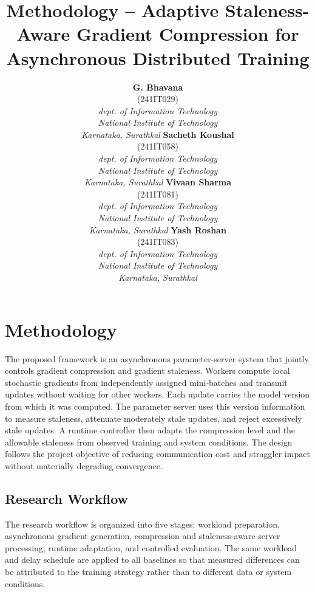 \documentclass[conference]{IEEEtran}
\title{Methodology -- Adaptive Staleness-Aware Gradient Compression for Asynchronous Distributed Training}
\author{%
\begin{tabular*}{\textwidth}{@{\extracolsep{\fill}}cccc@{}}
\parbox[t]{0.22\textwidth}{\centering
\textbf{G. Bhavana}\\[-1pt]
(241IT029)\\[-1pt]
\textit{dept. of Information Technology}\\[-1pt]
\textit{National Institute of Technology}\\[-1pt]
\textit{Karnataka, Surathkal}}
&
\parbox[t]{0.22\textwidth}{\centering
\textbf{Sacheth Koushal}\\[-1pt]
(241IT058)\\[-1pt]
\textit{dept. of Information Technology}\\[-1pt]
\textit{National Institute of Technology}\\[-1pt]
\textit{Karnataka, Surathkal}}
&
\parbox[t]{0.22\textwidth}{\centering
\textbf{Vivaan Sharma}\\[-1pt]
(241IT081)\\[-1pt]
\textit{dept. of Information Technology}\\[-1pt]
\textit{National Institute of Technology}\\[-1pt]
\textit{Karnataka, Surathkal}}
&
\parbox[t]{0.22\textwidth}{\centering
\textbf{Yash Roshan}\\[-1pt]
(241IT083)\\[-1pt]
\textit{dept. of Information Technology}\\[-1pt]
\textit{National Institute of Technology}\\[-1pt]
\textit{Karnataka, Surathkal}}
\end{tabular*}%
}
\begin{document}
\maketitle

\section{Methodology}
\label{sec:methodology}

The proposed framework is an asynchronous parameter-server system that jointly controls gradient compression and gradient staleness. Workers compute local stochastic gradients from independently assigned mini-batches and transmit updates without waiting for other workers. Each update carries the model version from which it was computed. The parameter server uses this version information to measure staleness, attenuate moderately stale updates, and reject excessively stale updates. A runtime controller then adapts the compression level and the allowable staleness from observed training and system conditions. The design follows the project objective of reducing communication cost and straggler impact without materially degrading convergence.

\subsection{Research Workflow}
\label{subsec:workflow}

The research workflow is organized into five stages: workload preparation, asynchronous gradient generation, compression and staleness-aware server processing, runtime adaptation, and controlled evaluation. The same workload and delay schedule are applied to all baselines so that measured differences can be attributed to the training strategy rather than to different data or system conditions.
\end{document}
